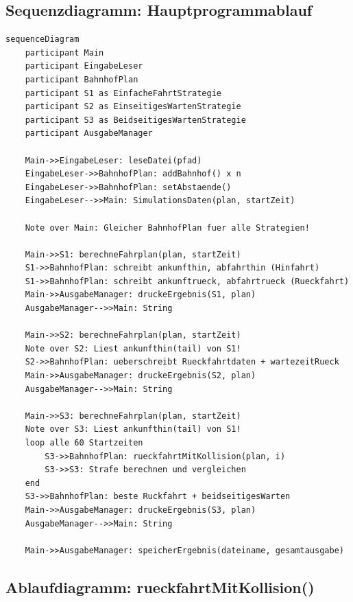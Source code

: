 \documentclass[12pt,a4paper]{article}
\begin{document}
\subsection{Sequenzdiagramm: Hauptprogrammablauf}

\begin{lstlisting}[style=mermaid, caption={Sequenzdiagramm -- Ablauf in Main.java}]
sequenceDiagram
    participant Main
    participant EingabeLeser
    participant BahnhofPlan
    participant S1 as EinfacheFahrtStrategie
    participant S2 as EinseitigesWartenStrategie
    participant S3 as BeidseitigesWartenStrategie
    participant AusgabeManager

    Main->>EingabeLeser: leseDatei(pfad)
    EingabeLeser->>BahnhofPlan: addBahnhof() x n
    EingabeLeser->>BahnhofPlan: setAbstaende()
    EingabeLeser-->>Main: SimulationsDaten(plan, startZeit)

    Note over Main: Gleicher BahnhofPlan fuer alle Strategien!

    Main->>S1: berechneFahrplan(plan, startZeit)
    S1->>BahnhofPlan: schreibt ankunfthin, abfahrthin (Hinfahrt)
    S1->>BahnhofPlan: schreibt ankunftrueck, abfahrtrueck (Rueckfahrt)
    Main->>AusgabeManager: druckeErgebnis(S1, plan)
    AusgabeManager-->>Main: String

    Main->>S2: berechneFahrplan(plan, startZeit)
    Note over S2: Liest ankunfthin(tail) von S1!
    S2->>BahnhofPlan: ueberschreibt Rueckfahrtdaten + wartezeitRueck
    Main->>AusgabeManager: druckeErgebnis(S2, plan)
    AusgabeManager-->>Main: String

    Main->>S3: berechneFahrplan(plan, startZeit)
    Note over S3: Liest ankunfthin(tail) von S1!
    loop alle 60 Startzeiten
        S3->>BahnhofPlan: rueckfahrtMitKollision(plan, i)
        S3->>S3: Strafe berechnen und vergleichen
    end
    S3->>BahnhofPlan: beste Ruckfahrt + beidseitigesWarten
    Main->>AusgabeManager: druckeErgebnis(S3, plan)
    AusgabeManager-->>Main: String

    Main->>AusgabeManager: speicherErgebnis(dateiname, gesamtausgabe)
\end{lstlisting}

\subsection{Ablaufdiagramm: rueckfahrtMitKollision()}
\end{document}
